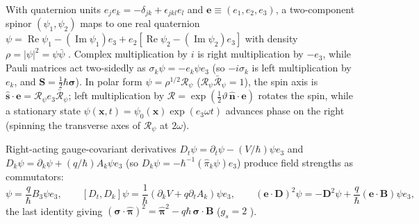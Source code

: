 \documentclass[aps,prd,onecolumn,tightenlines,nofootinbib,notitlepage,10pt,floatfix]{revtex4-2}
\theoremstyle{indentedtheorem}
\begin{document}
With quaternion units $e_j e_k=-\delta_{jk}+\epsilon_{jkl}e_l$ and $\mathbf{e}\equiv(e_1,e_2,e_3)$, a two-component spinor $(\psi_1,\psi_2)$ maps to one real quaternion $\psi=\operatorname{Re}\psi_1-(\operatorname{Im}\psi_1)e_3+e_2[\operatorname{Re}\psi_2-(\operatorname{Im}\psi_2)e_3]$ with density $\rho=|\psi|^2=\psi\bar{\psi}$ \citep{HutchisonWavefn2026}. Complex multiplication by $i$ is right multiplication by $-e_3$, while Pauli matrices act two-sidedly as $\sigma_k\psi=-e_k\psi e_3$ (so $-i\sigma_k$ is left multiplication by $e_k$, and $\mathbf{S}=\tfrac{1}{2}\hbar\boldsymbol{\sigma}$). In polar form $\psi=\rho^{1/2}\mathcal{R}_\psi$ ($\mathcal{R}_\psi\bar{\mathcal{R}}_\psi=1$), the spin axis is $\hat{\mathbf{s}}\cdot\mathbf{e}=\mathcal{R}_\psi e_3\bar{\mathcal{R}}_\psi$; left multiplication by $\mathcal{R}=\exp(\tfrac{1}{2}\vartheta\,\hat{\mathbf{n}}\cdot\mathbf{e})$ rotates the spin, while a stationary state $\psi(\mathbf{x},t)=\psi_0(\mathbf{x})\exp(e_3\omega t)$ advances phase on the right (spinning the transverse axes of $\mathcal{R}_\psi$ at $2\omega$).

Right-acting gauge-covariant derivatives $D_t\psi=\partial_t\psi-(V/\hbar)\psi e_3$ and $D_k\psi=\partial_k\psi+(q/\hbar)A_k\psi e_3$ (so $D_k\psi=-\hbar^{-1}(\hat{\pi}_k\psi)e_3$) produce field strengths as commutators:
\begin{equation}
    [D_1,D_2]\psi = \frac{q}{\hbar}B_3\psi e_3 , \qquad [D_t,D_k]\psi = \frac{1}{\hbar}(\partial_k V+q\partial_t A_k)\psi e_3 , \qquad (\mathbf{e}\cdot\mathbf{D})^2\psi = -\mathbf{D}^2\psi + \frac{q}{\hbar}(\mathbf{e}\cdot\mathbf{B})\psi e_3 ,
    \label{eq:fueter_square}
\end{equation}
the last identity giving $(\boldsymbol{\sigma}\cdot\hat{\boldsymbol{\pi}})^2=\hat{\boldsymbol{\pi}}^2-q\hbar\,\boldsymbol{\sigma}\cdot\mathbf{B}$ ($g_s=2$ \citep{Dirac1928Quantum}).
\end{document}
